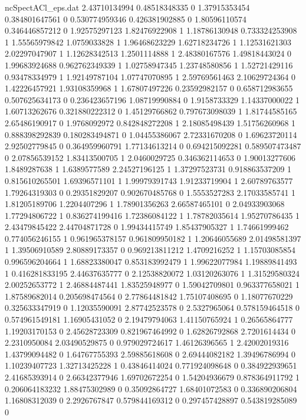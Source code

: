 \begin{filecontents}{ncSpectACl_eps.dat}
2.43710134994 0.48518348335 0
1.37915353454 0.384801647561 0
0.530774959346 0.426381902885 0
1.80596110574 0.346446857212 0
1.92575297123 1.82476922908 1
1.18786130948 0.733324253908 1
1.55565979842 1.0759033828 1
1.96468623229 1.62718234726 1
1.12531621303 2.02297047907 1
1.12628342513 1.2501114888 1
2.48380167576 1.49818443024 0
1.99683924688 0.962762349339 1
1.02758947345 1.23748580856 1
1.52721429116 0.93478334979 1
1.92149787104 1.07747070895 1
2.59769561463 2.10629724364 0
1.42226457921 1.93108359968 1
1.67807497226 0.23592982157 0
0.658712983655 0.507625634173 0
0.236423657196 1.08719990884 0
1.9158733329 1.14337000022 1
1.60713262676 0.321880222312 0
1.45129766862 0.797673098039 1
1.81744585165 2.65486190917 0
1.9768092972 0.842848272208 1
2.18085498439 1.51756260968 1
0.888398292839 0.180283494871 0
1.04455386067 2.72331670208 0
1.69623720114 2.92502779845 0
0.364959960791 1.77134613214 0
0.694215092281 0.589507473487 0
2.07856539152 1.83413500705 1
2.0460029725 0.346362114653 0
1.90013277606 1.8489287638 1
1.6389577589 2.24527196125 1
1.37297523731 0.918863537209 1
0.815610265501 1.69396571101 1
1.99979391743 1.91233719904 1
2.60789763577 1.79264319303 0
0.29351829207 0.902670485768 0
1.5553527283 2.17033585741 1
1.81205189706 1.2204407296 1
1.78901356263 2.66587465101 0
2.04933903068 1.77294806722 1
0.836274199416 1.72386084122 1
1.78782035614 1.95270786435 1
2.43479845422 2.44704871728 0
1.99434415749 1.85437905327 1
1.74661999462 0.774056246155 1
0.961965378157 0.961809950182 1
1.20646055689 2.01498581397 1
1.39506910589 2.80889173357 0
0.969213811212 1.4709216252 1
1.15703085854 0.996596204664 1
1.68823380047 0.853183992479 1
1.99622077984 1.19889841493 1
0.416281833195 2.44637635777 0
2.12538820072 1.03120263076 1
1.31529580324 2.00252653772 1
2.46884487441 1.83525948977 0
1.59042709801 0.963377658021 1
1.87589682014 0.205698474564 0
2.77864481842 1.75107408695 0
1.18077670229 0.325633347919 0
1.12035590091 2.87742523578 0
2.5327965064 0.578159464518 0
0.574961549181 1.16905431052 0
2.19479794063 1.41150765924 1
0.26565864777 1.19203170153 0
2.45628723309 0.821967464992 0
1.62826792868 2.7201614434 0
2.2310950084 2.03490529875 0
0.979029724617 1.46126396565 1
2.42002019316 1.43799094482 0
1.64767755393 2.59885618608 0
2.69444082182 1.39496786994 0
1.10239407723 1.32713425228 1
0.43846414024 0.771924098648 0
0.384922939651 2.41685393914 0
2.66342377946 1.69702672254 0
1.54204936679 0.878364911792 1
0.206064183232 1.88475302989 0
0.35092864727 1.68401072583 0
0.336890206804 1.16808312039 0
2.2926767847 0.579844169312 0
0.297457428897 0.543819285089 0

\end{filecontents}
